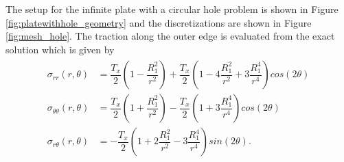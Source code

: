 The setup for the infinite plate with a circular hole problem is shown in Figure \ref{fig:platewithhole_geometry} and the discretizations are shown in Figure \ref{fig:mesh_hole}. The traction along the outer edge is evaluated from the exact solution which is given by
\begin{align}
    \begin{split}
        \sigma_{rr}(r,\theta)&=\dfrac{T_x}{2}(1-\dfrac{R_1^2}{r^2})+\dfrac{T_x}{2}(1-4\dfrac{R_1^2}{r^2}+3\dfrac{R_1^4}{r^4})cos(2\theta)\\
        \sigma_{\theta\theta}(r,\theta)&=\dfrac{T_x}{2}(1+\dfrac{R_1^2}{r^2})-\dfrac{T_x}{2}(1+3\dfrac{R_1^4}{r^4})cos(2\theta)\\
        \sigma_{r\theta}(r,\theta)&=-\dfrac{T_x}{2}(1+2\dfrac{R_1^2}{r^2}-3\dfrac{R_1^4}{r^4})sin(2\theta).
    \end{split}
\end{align}

